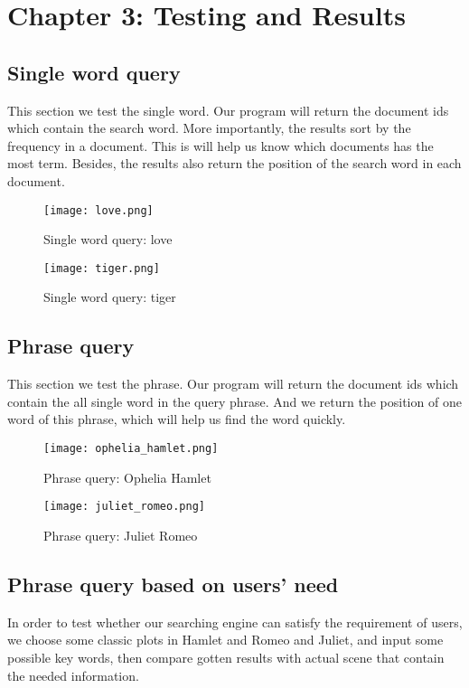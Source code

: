 \documentclass[12pt]{article}
\begin{document}
\section{Chapter 3: Testing and Results}

\subsection{Single word query}
This section we test the single word. Our program will return the document ids which contain the search word. More importantly, the results sort by the frequency in a document. This is will help us know which documents has the most term. Besides, the results also return the position of the search word in each document.
\begin{figure}[H]
	\centering
	\texttt{[image: love.png]}
	\caption{Single word query: love}
\end{figure}
\begin{figure}[H]
	\centering
	\texttt{[image: tiger.png]}
	\caption{Single word query: tiger}
\end{figure}

\subsection{Phrase query}
This section we test the phrase. Our program will return the document ids which contain the all single word in the query phrase. And we return the position of one word of this phrase, which will help us find the word quickly.
\begin{figure}[H]
	\centering
	\texttt{[image: ophelia\_hamlet.png]}
	\caption{Phrase query: Ophelia Hamlet}
\end{figure}
\begin{figure}[H]
	\centering
	\texttt{[image: juliet\_romeo.png]}
	\caption{Phrase query: Juliet Romeo}
\end{figure}
\subsection{Phrase query based on users' need}
In order to test whether our searching engine can satisfy the requirement of users, we choose some classic plots in Hamlet and Romeo and Juliet, and input some possible key words, then compare gotten results with actual scene that contain the needed information.
\end{document}
